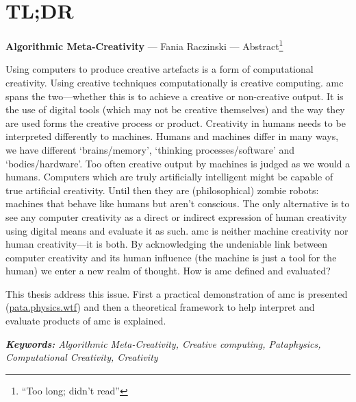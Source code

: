 
\pagestyle{empty}

\chapter{TL;DR}
\label{abstract}

{\Large \textbf{Algorithmic Meta-Creativity}} --- Fania Raczinski --- Abstract\footnote{``Too long; didn't read''}

\vspace{0.2cm}

Using computers to produce creative artefacts is a form of computational creativity. Using creative techniques computationally is creative computing. \gls{amc} spans the two---whether this is to achieve a creative or non-creative output. It is the use of digital tools (which may not be creative themselves) and the way they are used forms the creative process or product. Creativity in humans needs to be interpreted differently to machines. Humans and machines differ in many ways, we have different `brains/memory', `thinking processes/software' and `bodies/hardware'. Too often creative output by machines is judged as we would a humans. Computers which are truly artificially intelligent might be capable of true artificial creativity. Until then they are (philosophical) zombie robots: machines that behave like humans but aren't conscious. The only alternative is to see any computer creativity as a direct or indirect expression of human creativity using digital means and evaluate it as such. \gls{amc} is neither machine creativity nor human creativity---it is both. By acknowledging the undeniable link between computer creativity and its human influence (the machine is just a tool for the human) we enter a new realm of thought. How is \gls{amc} defined and evaluated?

This thesis address this issue. First a practical demonstration of \gls{amc} is presented (\url{pata.physics.wtf}) and then a theoretical framework to help interpret and evaluate products of \gls{amc} is explained.

\textit{\textbf{Keywords:} Algorithmic Meta-Creativity, Creative computing, Pataphysics, Computational Creativity, Creativity}

\clearpage
